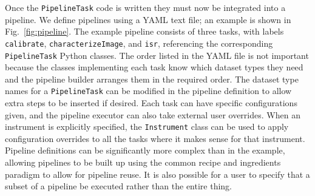 \documentclass[]{spie}
\begin{document}
Once the \texttt{PipelineTask} code is written they must now be integrated into a pipeline.
We define pipelines using a YAML text file; an example is shown in Fig.~\ref{fig:pipeline}.
The example pipeline consists of three tasks, with labels \texttt{calibrate}, \texttt{characterizeImage}, and \texttt{isr}, referencing the corresponding \texttt{PipelineTask} Python classes.
The order listed in the YAML file is not important because the classes implementing each task know which dataset types they need and the pipeline builder arranges them in the required order.
The dataset type names for a \texttt{PipelineTask} can be modified in the pipeline definition to allow extra steps to be inserted if desired.
Each task can have specific configurations given, and the pipeline executor can also take external user overrides.
When an instrument is explicitly specified, the \texttt{Instrument} class can be used to apply configuration overrides to all the tasks where it makes sense for that instrument.
Pipeline definitions can be significantly more complex than in the example, allowing pipelines to be built up using the common recipe and ingredients paradigm\cite{2015A&C.....9...40J,2020ASPC..522..583L} to allow for pipeline reuse.
It is also possible for a user to specify that a subset of a pipeline be executed rather than the entire thing.
\end{document}
